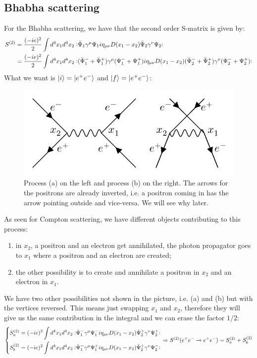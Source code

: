 \documentclass[../main.tex]{subfiles}
\begin{document}
\subsection{Bhabha scattering}
For the Bhabha scattering, we have that the second order S-matrix is given by:
\begin{align*}
S^{(2)}&=\frac{(-ie)^2}{2}\int d^4x_1d^4x_2\vcentcolon\mathrel{\bar{\Psi}_1\gamma^\mu\Psi_1i\eta_{\mu\nu}D(x_1-x_2)\bar{\Psi}_2\gamma^\nu\Psi_2}\vcentcolon\\
&=\frac{(-ie)^2}{2}\int d^4x_1d^4x_2\vcentcolon\mathrel{(\bar{\Psi}_1^-+\bar{\Psi}_1^+)\gamma^\mu(\Psi_1^-+\Psi_1^+)i\eta_{\mu\nu}D(x_1-x_2)(\bar{\Psi}_2^-+\bar{\Psi}_2^+)\gamma^\nu(\Psi_2^-+\Psi_2^+)}\vcentcolon
\end{align*}
What we want is $\ket{i}=\ket{e^+e^-}$ and $\ket{f}=\ket{e^+e^-}$:
\begin{figure}[h!]
    \centering
    \includegraphics{Images/bhabha.png}
    \caption{Process (a) on the left and process (b) on the right. The arrows for the positrons are already inverted, i.e. a positron coming in has the arrow pointing outside and vice-versa. We will see why later.}
\end{figure}

As seen for Compton scattering, we have different objects contributing to this process:
\begin{enumerate}[label=\alph*)]
\item in $x_2$, a positron and an electron get annihilated, the photon propagator goes to $x_1$ where a positron and an electron are created;
\item the other possibility is to create and annihilate a positron in $x_2$ and an electron in $x_1$. 
\end{enumerate}
We have two other possibilities not shown in the picture, i.e. (a) and (b) but with the vertices reversed. This means just swapping $x_1$ and $x_2$, therefore they will give us the same contribution in the integral and we can erase the factor $1/2$:
\[
\left\{
\begin{aligned}
S_a^{(2)}&=(-ie)^2\int d^4x_1d^4x_2\vcentcolon\mathrel{\bar{\Psi}_1^-\gamma^\mu\Psi_1^-i\eta_{\mu\nu}D(x_1-x_2)\bar{\Psi}_2^+\gamma^\nu\Psi_2^+}\vcentcolon\\
S_b^{(2)}&=(-ie)^2\int d^4x_1d^4x_2\vcentcolon\mathrel{\bar{\Psi}_1^-\gamma^\mu\Psi_1^+i\eta_{\mu\nu}D(x_1-x_2)\bar{\Psi}_2^+\gamma^\nu\Psi_2^-}\vcentcolon
\end{aligned}
\right.
\Rightarrow S^{(2)}(e^+e^-\xrightarrow[]{}e^+e^-)=S_a^{(2)}+S_b^{(2)}
\]
\end{document}
